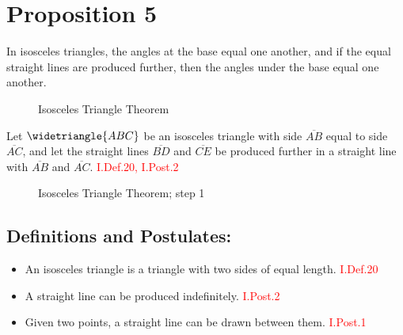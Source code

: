 \section*{Proposition 5}

\begin{thm}
In isosceles triangles, the angles at the base equal one another, and if the equal straight lines are produced further, then the angles under the base equal one another.
\end{thm}

\begin{figure}[H]
\centering
	\caption{Isosceles Triangle Theorem}
\end{figure}

Let $\widetriangle{ABC}$ be an isosceles triangle with side $\overline{AB}$ equal to side $\overline{AC}$, and let the straight lines $\overline{BD}$ and $\overline{CE}$ be produced further in a straight line with $\overline{AB}$ and $\overline{AC}$.\hfill \textcolor{red}{ I.Def.20, I.Post.2}

\begin{figure}[H]
\centering
	\caption{Isosceles Triangle Theorem; step 1}
\end{figure}

\subsection*{Definitions and Postulates:}
\begin{itemize}
  	\item An isosceles triangle is a triangle with two sides of equal length. \hfill\textcolor{red}{ I.Def.20}
  	\item A straight line can be produced indefinitely.\hfill\textcolor{red}{ I.Post.2}
  	\item Given two points, a straight line can be drawn between them.\hfill\textcolor{red}{ I.Post.1}
\end{itemize}

